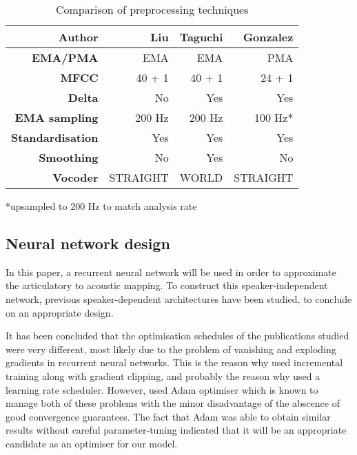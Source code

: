 \documentclass[a4paper]{article}
\begin{document}
\begin{table}[th]
  \caption{Comparison of preprocessing techniques}
  \vspace{0.5em}
  \label{tab:example}
  \centering
  \footnotesize
  \begin{tabular}{ r r r r }
    \toprule
    \textbf{Author} & \textbf{Liu} & \textbf{Taguchi} & \textbf{Gonzalez} \\
    \midrule
    \textbf{EMA/PMA} & EMA & EMA & PMA \\
    \textbf{MFCC} & 40 + 1 & 40 + 1 & 24 + 1 \\
    \textbf{Delta} & No & Yes & Yes \\
    \textbf{EMA sampling} & 200 Hz & 200 Hz & 100 Hz* \\
    \textbf{Standardisation} & Yes & Yes & Yes \\
    \textbf{Smoothing} & No & Yes  & No \\
    \textbf{Vocoder} & STRAIGHT \cite{Kawahara2006} & WORLD  & STRAIGHT \\
    \bottomrule
  \end{tabular}
  *upsampled to 200 Hz to match analysis rate
\end{table}

\subsection{Neural network design} \label{section:nnexperiment}

In this paper, a recurrent neural network will be used in order to
approximate the articulatory to acoustic mapping. To construct
this speaker-independent network, previous speaker-dependent architectures
have been studied, to conclude on an appropriate design.

It has been concluded that the optimisation schedules of the publications
studied were very different, most likely due to the problem of vanishing and
exploding gradients in recurrent neural networks.
This is the reason why \cite{Taguchi} used incremental
training along with gradient clipping, and probably the reason why \cite{Liu2018} used a learning rate
scheduler. However, \cite{Gonzalez2017} used Adam optimiser \cite{Kingma2015}
which is known to manage both of these problems with the minor disadvantage of
the abscence of good convergence guarantees. The fact that Adam was able
to obtain similar results without careful parameter-tuning indicated that
it will be an appropriate candidate as an optimiser for our model. 
\end{document}

